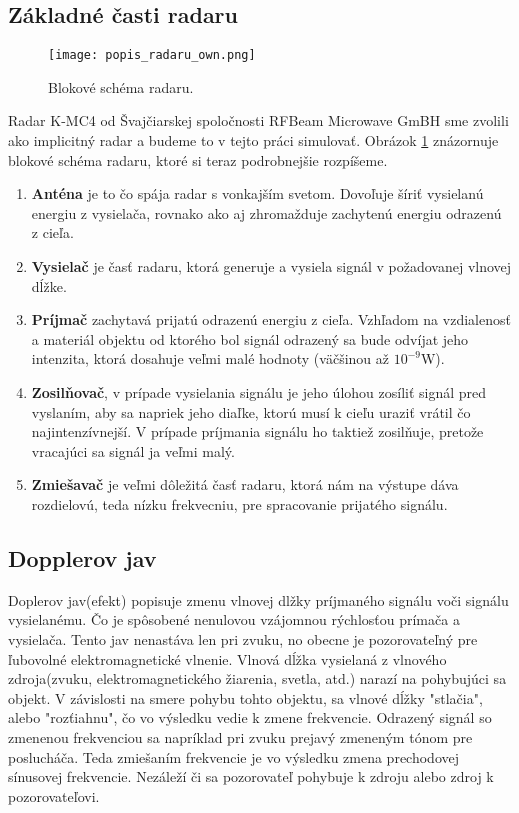\documentclass[slovak]{ExcelAtFIT} %
\begin{document}
	\subsection{Základné časti radaru}
  \begin{figure}[t]
    \centering
    \texttt{[image: popis\_radaru\_own.png]}
    \caption{Blokové schéma radaru.}
    \label{fig:popis_radaru_own}
  \end{figure}  
    Radar K-MC4 od Švajčiarskej spoločnosti RFBeam Microwave GmBH sme zvolili ako implicitný radar a budeme to v tejto práci simulovať. Obrázok \ref{fig:popis_radaru_own} znázornuje blokové schéma radaru, ktoré si teraz podrobnejšie rozpíšeme.
    \begin{enumerate}
      \item \textbf{Anténa} je to čo spája radar s vonkajším svetom. Dovoľuje šíriť vysielanú energiu z vysielača, rovnako ako aj zhromažduje zachytenú energiu odrazenú z cieľa.
      \item \textbf{Vysielač} je časť radaru, ktorá generuje a vysiela signál v požadovanej vlnovej dĺžke. 	
      \item \textbf{Príjmač} zachytavá prijatú odrazenú energiu z cieľa. Vzhľadom na vzdialenosť a materiál objektu od ktorého bol signál odrazený sa bude odvíjat jeho intenzita, ktorá dosahuje veľmi malé hodnoty (väčšinou až $10^{-9}$W).
      \item \textbf{Zosilňovač}, v prípade vysielania signálu je jeho úlohou zosíliť signál pred vyslaním, aby sa napriek jeho diaľke, ktorú musí k cieľu uraziť vrátil čo najintenzívnejší. V prípade príjmania signálu ho taktiež zosilňuje, pretože vracajúci sa signál ja veľmi malý.  
      \item \textbf{Zmiešavač} je veľmi dôležitá časť radaru, ktorá nám na výstupe dáva rozdielovú, teda nízku frekvecniu, pre spracovanie prijatého signálu.       
    \end{enumerate}

  \subsection{Dopplerov jav}   
    
    Doplerov jav(efekt) popisuje zmenu vlnovej dlžky príj\-maného signálu voči signálu vysielanému. Čo je spôsobené nenulovou vzájomnou rýchlosťou prímača a vysielača.
    Tento jav nenastáva len pri zvuku, no obecne je pozorovateľný pre ľubovolné elektromagnetické vlnenie. 
    Vlnová dĺžka vysielaná z vlnového zdroja(zvuku, elektromagnetického žiarenia, svetla, atd.) narazí na pohybujúci sa objekt. V závislosti na smere pohybu tohto objektu, sa vlnové dĺžky "stlačia", alebo "rozťiahnu", čo vo výsledku vedie k zmene frekvencie. Odrazený signál so zmenenou frekvenciou sa napríklad pri zvuku prejavý zmeneným tónom pre poslucháča. Teda zmiešaním frekvencie je vo výsledku zmena prechodovej sínusovej frekvencie. Nezáleží či sa pozorovateľ pohybuje k zdroju alebo zdroj k pozorovateľovi\cite{radarsensing}\cite{radarsystems}.
    
\end{document}

